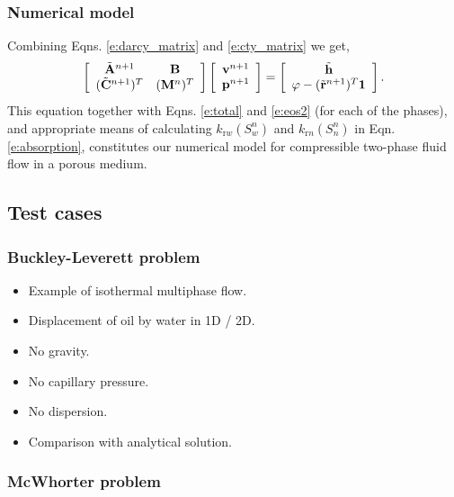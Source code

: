 \subsubsection{Numerical model}

Combining Eqns. \ref{e:darcy_matrix} and \ref{e:cty_matrix} we get,
\begin{equation}
\left[ \begin{array}{c c}
\tilde{\mathbf{A}}^{n+1} & \mathbf{B}\\
(\tilde{\mathbf{C}}^{n+1})^T & (\mathbf{M}^n)^T
\end{array} \right]
\left[ \begin{array}{c}
\mathbf{v}^{n+1}\\
\mathbf{p}^{n+1}
\end{array} \right] =
\left[ \begin{array}{c}
\tilde{\mathbf{h}}\\
\phi - (\tilde{\mathbf{r}}^{n+1})^T \mathbf{1}
\end{array} \right].
\end{equation}
This equation together with Eqns. \ref{e:total} and \ref{e:eos2} (for each of the phases), and appropriate means of calculating $k_{\mathrm{r}w}(S^n_w)$ and $k_{\mathrm{r}n}(S^n_n)$ in Eqn. \ref{e:absorption}, constitutes our numerical model for compressible two-phase fluid flow in a porous medium.

\subsection{Test cases}

\subsubsection{Buckley-Leverett problem}

\begin{itemize}
\item Example of isothermal multiphase flow.
\item Displacement of oil by water in 1D / 2D.
\item No gravity.
\item No capillary pressure.
\item No dispersion.
\item Comparison with analytical solution.
\end{itemize}

\subsubsection{McWhorter problem}

